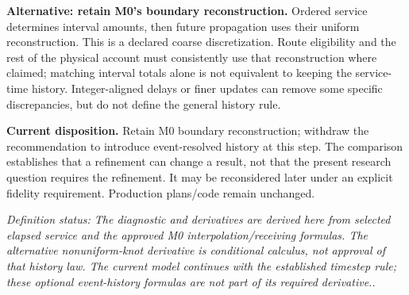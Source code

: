 \documentclass[11pt]{article}
\newcommand{\status}[1]{\textit{Definition status: #1.}}
\begin{document}
\textbf{Alternative: retain M0's boundary reconstruction.} Ordered service determines interval amounts, then future propagation uses their uniform reconstruction. This is a declared coarse discretization. Route eligibility and the rest of the physical account must consistently use that reconstruction where claimed; matching interval totals alone is not equivalent to keeping the service-time history. Integer-aligned delays or finer updates can remove some specific discrepancies, but do not define the general history rule.

\textbf{Current disposition.} Retain M0 boundary reconstruction; withdraw the recommendation to introduce event-resolved history at this step. The comparison establishes that a refinement can change a result, not that the present research question requires the refinement. It may be reconsidered later under an explicit fidelity requirement. Production plans/code remain unchanged.

\status{The diagnostic and derivatives are derived here from selected elapsed service and the approved M0 interpolation/receiving formulas. The alternative nonuniform-knot derivative is conditional calculus, not approval of that history law. The current model continues with the established timestep rule; these optional event-history formulas are not part of its required derivative.}
\end{document}
